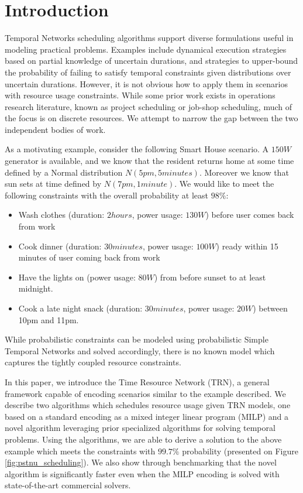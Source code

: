 \section{Introduction}
Temporal Networks scheduling algorithms support diverse formulations useful in modeling practical problems. Examples include dynamical execution strategies based on partial knowledge of uncertain durations, and strategies to upper-bound the probability of failing to satisfy temporal constraints given distributions over uncertain durations. However, it is not obvious how to apply them in scenarios with resource usage constraints. While some prior work exists in operations research literature, known as project scheduling or job-shop scheduling, much of the focus is on discrete resources. We attempt to narrow the gap between the two independent bodies of work.

As a motivating example, consider the following Smart House scenario. A $150W$ generator is available, and we know that the resident returns home at some time defined by a Normal distribution $N(5pm, 5minutes)$. Moreover we know that sun sets at time defined by $N(7pm, 1minute)$. We would like to meet the following constraints with the overall probability at least $98\%$:
\small{
  \begin{itemize}
  \setlength\itemsep{0.00em}

  \item Wash clothes (duration: $2hours$, power usage: $130W$) before user comes back from work
  \item Cook dinner (duration: $30minutes$, power usage: $100W$) ready within 15 minutes of user coming back from work
  \item Have the lights on (power usage: $80W$) from before sunset to at least midnight.
  \item Cook a late night snack (duration: $30minutes$, power usage: $20W$) between 10pm and 11pm.
  \end{itemize}
}
While probabilistic constraints can be  modeled using probabilistic Simple Temporal Networks \cite{Fang2014} and solved accordingly, there is no known model which captures the tightly coupled resource constraints.

In this paper, we introduce the Time Resource Network (TRN), a general framework capable of encoding scenarios similar to the example described. We describe two algorithms which schedules resource usage given TRN models, one based on a standard encoding as a mixed integer linear program (MILP) and a novel algorithm leveraging prior specialized algorithms for solving temporal problems. Using the algorithms, we are able to derive a solution to the above example which meets the constraints with $99.7\%$ probability (presented on Figure \ref{fig:pstnu_scheduling}). We also show through benchmarking that the novel algorithm is significantly faster even when the MILP encoding is solved with state-of-the-art commercial solvers.


